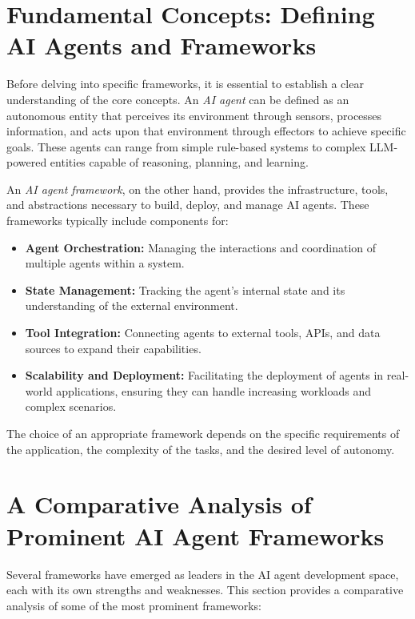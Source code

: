 \documentclass[a4paper,headinclude=on,footinclude=on,12pt,oneside]{scrbook}
\begin{document}
\section*{Fundamental Concepts: Defining AI Agents and Frameworks}

Before delving into specific frameworks, it is essential to establish a clear understanding of the core concepts. An \textit{AI agent} can be defined as an autonomous entity that perceives its environment through sensors, processes information, and acts upon that environment through effectors to achieve specific goals. These agents can range from simple rule-based systems to complex LLM-powered entities capable of reasoning, planning, and learning.

An \textit{AI agent framework}, on the other hand, provides the infrastructure, tools, and abstractions necessary to build, deploy, and manage AI agents. These frameworks typically include components for:

\begin{itemize}
	\item \textbf{Agent Orchestration:} Managing the interactions and coordination of multiple agents within a system.
	\item \textbf{State Management:} Tracking the agent's internal state and its understanding of the external environment.
	\item \textbf{Tool Integration:} Connecting agents to external tools, APIs, and data sources to expand their capabilities.
	\item \textbf{Scalability and Deployment:} Facilitating the deployment of agents in real-world applications, ensuring they can handle increasing workloads and complex scenarios.
\end{itemize}

The choice of an appropriate framework depends on the specific requirements of the application, the complexity of the tasks, and the desired level of autonomy.

\section*{A Comparative Analysis of Prominent AI Agent Frameworks}

Several frameworks have emerged as leaders in the AI agent development space, each with its own strengths and weaknesses. This section provides a comparative analysis of some of the most prominent frameworks:

\end{document}

